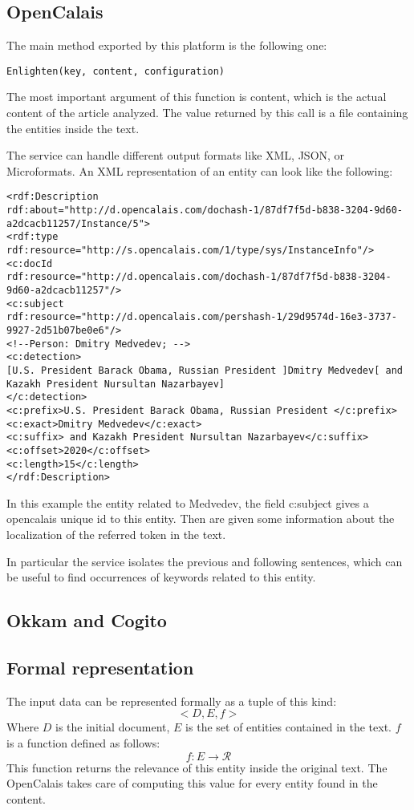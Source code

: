 \documentclass{acm_proc_article-sp-sigmod07}
\begin{document}
\subsection{OpenCalais}
The main method exported by this platform is the following one:
\begin{verbatim}
Enlighten(key, content, configuration)
\end{verbatim}
The most important argument of this function is content, which is the
actual content of the article analyzed. The value returned by this call is
a file containing the entities inside the text.

The service can handle different output formats like XML, JSON, or
Microformats. An XML representation of an entity can look like the
following:
\begin{lstlisting}
<rdf:Description
rdf:about="http://d.opencalais.com/dochash-1/87df7f5d-b838-3204-9d60-a2dcacb11257/Instance/5">
<rdf:type rdf:resource="http://s.opencalais.com/1/type/sys/InstanceInfo"/>
<c:docId
rdf:resource="http://d.opencalais.com/dochash-1/87df7f5d-b838-3204-9d60-a2dcacb11257"/>
<c:subject
rdf:resource="http://d.opencalais.com/pershash-1/29d9574d-16e3-3737-9927-2d51b07be0e6"/>
<!--Person: Dmitry Medvedev; -->
<c:detection>
[U.S. President Barack Obama, Russian President ]Dmitry Medvedev[ and
Kazakh President Nursultan Nazarbayev]
</c:detection>
<c:prefix>U.S. President Barack Obama, Russian President </c:prefix>
<c:exact>Dmitry Medvedev</c:exact>
<c:suffix> and Kazakh President Nursultan Nazarbayev</c:suffix>
<c:offset>2020</c:offset>
<c:length>15</c:length>
</rdf:Description>
\end{lstlisting}

In this example the entity related to Medvedev, the field c:subject gives
a opencalais unique id to this entity. Then are given some information
about the localization of the referred token in the text.

In particular the service isolates the previous and following sentences,
which can be useful to find occurrences of keywords related to this
entity.

\subsection{Okkam and Cogito}

\subsection{Formal representation}
The input data can be represented formally as a tuple of this kind:
$$
<D, E, f>
$$
Where $D$ is the initial document, $E$ is the set of entities contained in
the text.
$f$ is a function defined as follows:
$$
f: E \rightarrow \mathcal{R}
$$
This function returns the relevance of this entity inside the original
text. The OpenCalais takes care of computing this value for every entity
found in the content.
\end{document}
